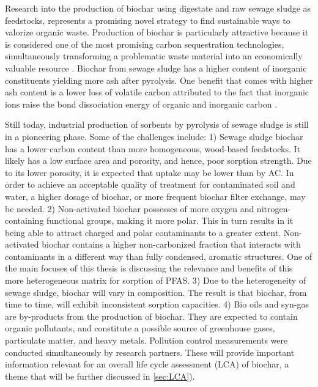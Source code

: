 Research into the production of biochar using digestate and raw sewage sludge as feedstocks, represents a promising novel strategy to find sustainable ways to valorize organic waste. Production of biochar is particularly attractive because it is considered one of the most promising carbon sequestration technologies, simultaneously transforming a problematic waste material into an economically valuable resource \citep{arvaniti2014sorption}. Biochar from sewage sludge has a higher content of inorganic constituents yielding more ash after pyrolysis. One benefit that comes with higher ash content is a lower loss of volatile carbon attributed to the fact that inorganic ions raise the bond dissociation energy of organic and inorganic carbon \citep{Cantrell2012}. 

Still today, industrial production of sorbents by pyrolysis of sewage sludge is still in a pioneering phase. Some of the challenges include: 1) Sewage sludge biochar has a lower carbon content than more homogeneous, wood-based feedstocks. It likely has a low surface area and porosity, and hence, poor sorption strength. Due to its lower porosity, it is expected that uptake may be lower than by AC. In order to achieve an acceptable quality of treatment for contaminated soil and water, a higher dosage of biochar, or more frequent biochar filter exchange, may be needed. 2) Non-activated biochar possesses of more oxygen and nitrogen-containing functional groups, making it more polar. This in turn results in it being able to attract charged and polar contaminants to a greater extent. Non-activated biochar contains a higher non-carbonized fraction that interacts with contaminants in a different way than fully condensed, aromatic structures. One of the main focuses of this thesis is discussing the relevance and benefits of this more heterogeneous matrix for sorption of PFAS. 3) Due to the heterogeneity of sewage sludge, biochar will vary in composition. The result is that biochar, from time to time, will exhibit inconsistent sorption capacities. 4) Bio oils and syn-gas are by-products from the production of biochar. They are expected to contain organic pollutants, and constitute a possible source of greenhouse gases, particulate matter, and heavy metals. Pollution control measurements were conducted simultaneously by research partners. These will provide important information relevant for an overall life cycle assessment (\acrshort{LCA}) of biochar, a theme that will be further discussed in \cref{sec:LCA}).

